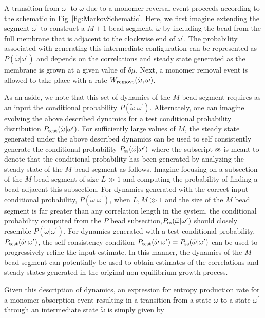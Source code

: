 \documentclass[amsmath,preprintnumbers,10pt,nofootinbib,prl,twocolumn]{revtex4-1}
\begin{document}
A transition from $\omega^\prime$ to $\omega$ due to a monomer reversal event proceeds according to the schematic in Fig~\ref{fig:MarkovSchematic}. Here, we first imagine extending the segment $\omega^\prime$ to construct a $M+1$ bead segment, $\tilde{\omega}$ by including the bead from the full membrane that is adjacent to the clockwise end of $\omega^\prime$. The probability associated with generating this intermediate configuration can be represented as $P(\tilde{\omega}|\omega^\prime)$ and depends on the correlations and steady state generated as the membrane is grown at a given value of $\delta \mu$. Next, a monomer removal event is allowed to take place with a rate $W_{\rm remove}(\tilde{\omega},\omega)$. 

As an aside, we note that this set of dynamics of the $M$ bead segment requires as an input the conditional probability $P(\tilde{\omega}|\omega^\prime)$. Alternately, one can imagine evolving the above described dynamics for a test conditional probability distribution $P_{\rm test}(\tilde{\omega}|\omega^\prime)$. For sufficiently large values of $M$, the steady state generated under the above described dynamics can be used to self consistently generate the conditional probability $P_{\rm ss}(\tilde{\omega}|\omega^\prime)$ where the subscript ${\rm ss}$ is meant to denote that the conditional probability has been generated by analyzing the steady state of the $M$ bead segment as follows. Imagine focusing on a subsection of the $M$ bead segment of size $L\gg 1$ and computing the probability of finding a bead adjacent this subsection. For dynamics generated with the correct input conditional probability, $P(\tilde{\omega}|\omega^\prime)$, when $L,M\gg 1$ and the size of the $M$ bead segment is far greater than any correlation length in the system, the conditional probability computed from the $P$ bead subsection,$P_{\rm ss}(\tilde{\omega}|\omega^\prime)$ should closely resemble $P(\tilde{\omega}|\omega^\prime)$. For dynamics generated with a test conditional probability, $P_{\rm test}(\tilde{\omega}|\omega^\prime)$, the self consistency condition $P_{\rm test}(\tilde{\omega}|\omega^\prime)=P_{\rm ss}(\tilde{\omega}|\omega^\prime)$ can be used to progressively refine the input estimate. In this manner, the dynamics of the $M$ bead segment can potentially be used to obtain estimates of the correlations and steady states generated in the original non-equilibrium growth process. 


Given this description of dynamics, an expression for entropy production rate for a monomer absorption event resulting in a transition from a state $\omega$ to a state $\omega^\prime$ through an intermediate state $\tilde\omega$ is simply given by 
\end{document}
